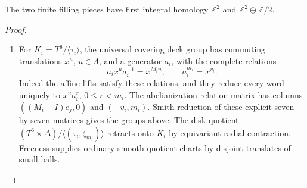   






\begin{theorem}\hypertarget{tag-02QU}{}\label{night:P1.3}
The two finite filling pieces have first integral homology
$\mathbb Z^2$ and $\mathbb Z^2\oplus\mathbb Z/2$.
\end{theorem}
\begin{proof}
\begin{enumerate}[label={$\langle1\rangle$\arabic*.}]
\item For $K_i=T^6/\langle\tau_i\rangle$, the universal covering deck group
has commuting translations $x^u$, $u\in\Lambda$, and a generator $a_i$,
with the complete relations
\[
a_ix^ua_i^{-1}=x^{M_iu},\qquad a_i^{m_i}=x^{v_i}.
\]
Indeed the affine lifts satisfy these relations, and they reduce every
word uniquely to $x^ua_i^r$, $0\leq r<m_i$.
The abelianization relation matrix has columns
$((M_i-I)e_j,0)$ and $(-v_i,m_i)$.
Smith reduction of these explicit seven-by-seven matrices gives the
groups above.  The disk quotient
$(T^6\times\Delta)/\langle(\tau_i,\zeta_{m_i})\rangle$
retracts onto $K_i$ by equivariant radial contraction.  Freeness supplies
ordinary smooth quotient charts by disjoint translates of small balls.

\end{enumerate}
\end{proof}


